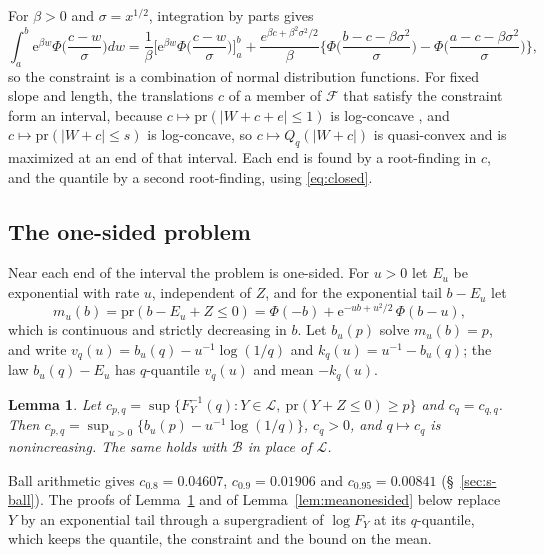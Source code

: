 \documentclass[11pt]{article}
\renewcommand{\_}{\usc\allowbreak}
\newtheorem{lemma}{Lemma}
\newcommand{\pr}{\mathrm{pr}}
\newcommand{\LC}{\mathcal{L}}
\begin{document}
For $\beta > 0$ and $\sigma = x^{1/2}$, integration by parts gives
\begin{equation}\label{eq:closed}
\int_a^b \mathrm{e}^{\beta w}\Phi\Big(\frac{c-w}{\sigma}\Big)dw = \frac{1}{\beta}\Big[\mathrm{e}^{\beta w}\Phi\Big(\frac{c-w}{\sigma}\Big)\Big]_a^b + \frac{e^{\beta c + \beta^2\sigma^2/2}}{\beta}\Big\{\Phi\Big(\frac{b-c-\beta\sigma^2}{\sigma}\Big) - \Phi\Big(\frac{a-c-\beta\sigma^2}{\sigma}\Big)\Big\},
\end{equation}
so the constraint is a combination of normal distribution functions. For fixed slope and length, the translations $c$ of a member of $\mathcal F$ that satisfy the constraint form an interval, because $c \mapsto \pr(|W + c + e| \le 1)$ is log-concave \citep{prekopa1973}, and $c \mapsto \pr(|W + c| \le s)$ is log-concave, so $c \mapsto Q_q(|W + c|)$ is quasi-convex and is maximized at an end of that interval. Each end is found by a root-finding in $c$, and the quantile by a second root-finding, using \eqref{eq:closed}.

\subsection*{The one-sided problem}

Near each end of the interval the problem is one-sided. For $u > 0$ let $E_u$ be exponential with rate $u$, independent of $Z$, and for the exponential tail $b - E_u$ let
\[
m_u(b) = \pr(b - E_u + Z \le 0) = \Phi(-b) + \mathrm{e}^{-ub + u^2/2}\,\Phi(b - u),
\]
which is continuous and strictly decreasing in $b$. Let $b_u(p)$ solve $m_u(b) = p$, and write $v_q(u) = b_u(q) - u^{-1}\log(1/q)$ and $k_q(u) = u^{-1} - b_u(q)$; the law $b_u(q) - E_u$ has $q$-quantile $v_q(u)$ and mean $-k_q(u)$.

\begin{lemma}\label{lem:onesided}
Let $c_{p,q} = \sup\{F_Y^{-1}(q) : Y \in \LC,\ \pr(Y + Z \le 0) \ge p\}$ and $c_q = c_{q,q}$. Then $c_{p,q} = \sup_{u > 0}\{b_u(p) - u^{-1}\log(1/q)\}$, $c_q > 0$, and $q \mapsto c_q$ is nonincreasing. The same holds with $\mathcal B$ in place of $\LC$.
\end{lemma}

Ball arithmetic gives $c_{0.8} = 0.04607$, $c_{0.9} = 0.01906$ and $c_{0.95} = 0.00841$ (\S~\ref{sec:s-ball}). The proofs of Lemma~\ref{lem:onesided} and of Lemma~\ref{lem:meanonesided} below replace $Y$ by an exponential tail through a supergradient of $\log F_Y$ at its $q$-quantile, which keeps the quantile, the constraint and the bound on the mean.
\end{document}
